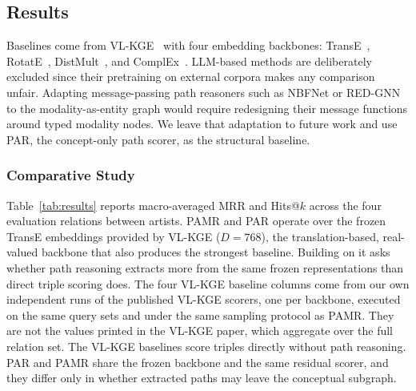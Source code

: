 \documentclass[runningheads]{llncs}
\begin{document}
\subsection{Results}
\label{sec:results}

Baselines come from VL-KGE~\cite{efthymiou2026vlkge} with four embedding
backbones: TransE~\cite{bordes2013translating}, RotatE~\cite{sun2019rotate}, DistMult~\cite{yang2015embedding}, and ComplEx~\cite{trouillon2016complex}. LLM-based methods are
deliberately excluded since their pretraining on external corpora makes
any comparison unfair. Adapting message-passing path reasoners such as
NBFNet or RED-GNN to the modality-as-entity graph would require
redesigning their message functions around typed modality nodes. We leave
that adaptation to future work and use PAR, the concept-only path scorer,
as the structural baseline.

\subsubsection{Comparative Study}

Table~\ref{tab:results} reports macro-averaged MRR and Hits@$k$ across
the four evaluation relations between artists. PAMR and PAR operate over
the frozen TransE embeddings provided by VL-KGE ($D = 768$), the
translation-based, real-valued backbone that also produces the strongest
baseline. Building on it asks whether path reasoning extracts more from
the same frozen representations than direct triple scoring does. The four
VL-KGE baseline columns come from
our own independent runs of the published VL-KGE scorers, one per
backbone, executed on the same query sets and under the same sampling protocol as PAMR.
They are not the values printed in the VL-KGE paper, which aggregate over
the full relation set. The VL-KGE baselines score triples directly
without path reasoning. PAR and PAMR share the frozen backbone and the
same residual scorer, and they differ only in whether extracted paths
may leave the conceptual subgraph.
\end{document}
